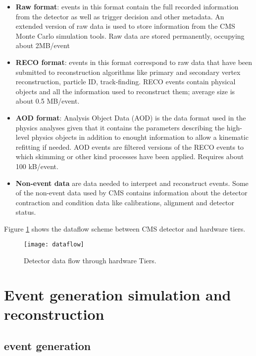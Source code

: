 \begin{itemize}
\item \textbf{Raw format}: events in this format contain the full recorded information from the detector as well as trigger decision and other metadata. An extended version of raw data is used to store information from the CMS Monte Carlo simulation tools. Raw data are stored permanently, occupying about 2MB/event   
\item \textbf{RECO format}: events in this format correspond to raw data that have been submitted to reconstruction algorithms like primary and secondary vertex reconstruction, particle ID, track-finding. RECO events contain physical objects and all the information used to reconstruct them; average size is about 0.5 MB/event.     
\item \textbf{AOD format}: Analysis Object Data (AOD) is the data format used in the physics analyses given that it contains the parameters describing the high-level physics objects in addition to enought information to allow a kinematic refitting if needed. AOD events are filtered versions of the RECO events to which skimming or other kind processes have been applied. Requires about 100 kB/event.
\item \textbf{Non-event data} are data needed to interpret and reconstruct events. Some of the non-event data used by CMS contains information about the detector contraction and condition data like calibrations, alignment and detector status.  
\end{itemize}

\noindent Figure \ref{fig:dataflow} shows the dataflow scheme between CMS detector and hardware tiers.

\begin{figure}[h!]
  \centering
  \texttt{[image: dataflow]}
  \caption[Detector data flow through hardware Tiers]{Detector data flow through hardware Tiers. }
  \label{fig:dataflow}
\end{figure}






\section{Event generation  simulation and reconstruction}
\subsection{ event generation}
